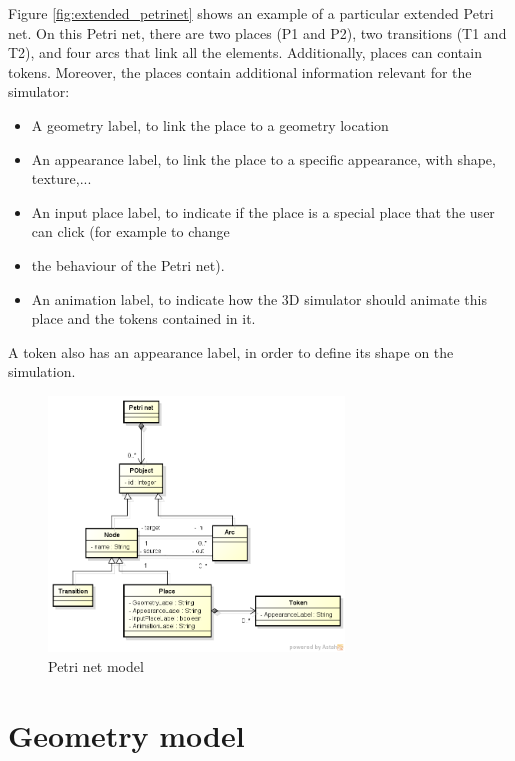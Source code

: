 \documentclass[11pt]{article}   %
\begin{document}
Figure \ref{fig:extended_petrinet} shows an example of a particular extended Petri net. On this Petri net, there are two places (P1 and P2), two transitions (T1 and T2), and four arcs that link all the elements. Additionally, places can contain tokens. Moreover, the places contain additional information relevant for the simulator:
\begin{itemize}
\item A geometry label, to link the place to a geometry location
\item An appearance label, to link the place to a specific appearance, with shape, texture,...
\item An input place label, to indicate if the place is a special place that the user can click (for example to change \item the behaviour of the Petri net).
\item An animation label, to indicate how the 3D simulator should animate this place and the tokens contained in it.
\end{itemize}
A token also has an appearance label, in order to define its shape on the simulation.

\begin{figure}[htp]
\begin{center}
  \includegraphics[width=0.7\textwidth]{image/petrinet_model.png}
  \caption{Petri net model}
  \label{fig:petrinet}
\end{center}
\end{figure}

\newpage
\section{Geometry model}
\end{document}
